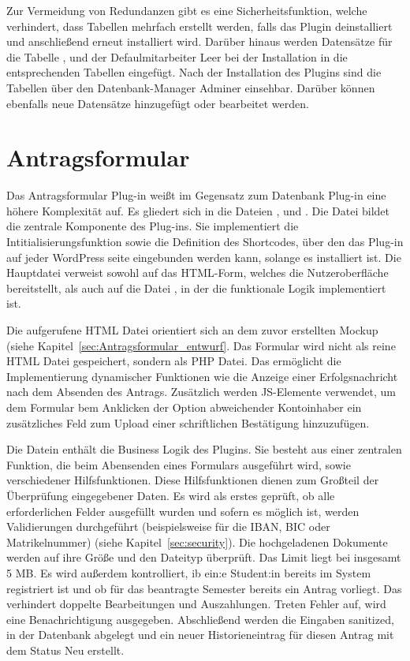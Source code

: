 Zur Vermeidung von Redundanzen gibt es eine Sicherheitsfunktion, welche verhindert, dass Tabellen mehrfach erstellt werden, falls das Plugin deinstalliert und anschließend erneut installiert wird. Darüber hinaus werden Datensätze für die Tabelle ,  und der Defaulmitarbeiter \glqq{}Leer\grqq{} bei der Installation in die entsprechenden Tabellen eingefügt. Nach der Installation des Plugins sind die Tabellen über den Datenbank-Manager Adminer einsehbar. Darüber können ebenfalls neue Datensätze hinzugefügt oder bearbeitet werden.


\section{Antragsformular}\label{sec:Antragsformular}
Das Antragsformular Plug-in weißt im Gegensatz zum Datenbank Plug-in eine höhere Komplexität auf. Es gliedert sich in die Dateien ,  und . 
Die Datei  bildet die zentrale Komponente des Plug-ins. Sie implementiert die Intitialisierungsfunktion sowie die Definition des Shortcodes, über den das Plug-in auf jeder WordPress seite eingebunden werden kann, solange es installiert ist. Die Hauptdatei verweist sowohl auf das HTML-Form, welches die Nutzeroberfläche bereitstellt, als auch auf die Datei , in der die funktionale Logik implementiert ist. 

Die aufgerufene HTML Datei orientiert sich an dem zuvor erstellten Mockup (siehe Kapitel~\ref{sec:Antragsformular_entwurf}. Das Formular wird nicht als reine HTML Datei gespeichert, sondern als PHP Datei. Das ermöglicht die Implementierung dynamischer Funktionen wie die Anzeige einer Erfolgsnachricht nach dem Absenden des Antrags. Zusätzlich werden JS-Elemente verwendet, um dem Formular bem Anklicken der Option \glqq{}abweichender Kontoinhaber\grqq{} ein zusätzliches Feld zum Upload einer schriftlichen Bestätigung hinzuzufügen. 

Die Datein  enthält die Business Logik des Plugins. Sie besteht aus einer zentralen Funktion, die beim Abensenden eines Formulars ausgeführt wird, sowie verschiedener Hilfsfunktionen. Diese Hilfsfunktionen dienen zum Großteil der Überprüfung eingegebener Daten. Es wird als erstes geprüft, ob alle erforderlichen Felder ausgefüllt wurden und sofern es möglich ist, werden Validierungen durchgeführt (beispielsweise für die IBAN, BIC oder Matrikelnummer) (siehe Kapitel~\ref{sec:security}). Die hochgeladenen Dokumente werden auf ihre Größe und den Dateityp überprüft. Das Limit liegt bei insgesamt 5 MB. Es wird außerdem kontrolliert, ib ein:e Student:in bereits im System registriert ist und ob für das beantragte Semester bereits ein Antrag vorliegt. Das verhindert doppelte Bearbeitungen und Auszahlungen. Treten Fehler auf, wird eine Benachrichtigung ausgegeben. Abschließend werden die Eingaben sanitized, in der Datenbank abgelegt und ein neuer Historieneintrag für diesen Antrag mit dem Status \glqq{}Neu\grqq{} erstellt. 


